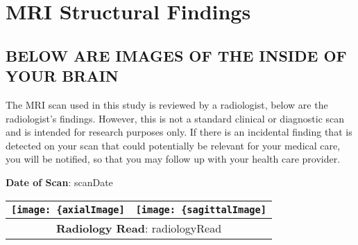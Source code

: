 \section{MRI Structural Findings}

\subsection{BELOW ARE IMAGES OF THE INSIDE OF YOUR BRAIN}

The MRI scan used in this study is reviewed by a radiologist, below are the
radiologist's findings. However, this is not a standard clinical or diagnostic
scan and is intended for research purposes only. If there is an incidental
finding that is detected on your scan that could potentially be relevant for
your medical care, you will be notified, so that you may follow up with your
health care provider.

\textbf{Date of Scan}: {{scanDate}}

\setlength{\arrayrulewidth}{0.65mm}

\begin{table}[h!]
    \centering
    \begin{tabular}{cc}
        \texttt{[image: \{axialImage]}} & \texttt{[image: \{sagittalImage]}}
        \\ \hline
        \multicolumn{2}{c}{\parbox{0.8\textwidth}{\raggedright \vspace*{5mm} \textbf{Radiology Read}: {{radiologyRead}} \vspace*{5mm}}} 
        \\ \hline
    \end{tabular}
\end{table}
